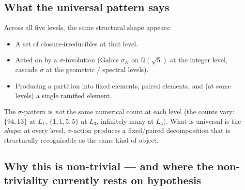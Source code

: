 \documentclass[11pt,a4paper]{article}
\theoremstyle{definition}
\theoremstyle{remark}
\begin{document}
\subsection{What the universal pattern says}

Across all five levels, the same structural shape appears:

\begin{itemize}\itemsep0pt
  \item A set of closure-irreducibles at that level.
  \item Acted on by a $\sigma$-involution (Galois $\sigma_K$ on $\mathbb{Q}(\sqrt{5})$ at the integer level, cascade $\sigma$ at the geometric / spectral levels).
  \item Producing a partition into fixed elements, paired elements, and (at some levels) a single ramified element.
\end{itemize}

The $\sigma$-pattern is \emph{not} the same numerical count at each
level (the counts vary: $\{94, 13\}$ at $L_1$, $\{1, 1, 5, 5\}$ at $L_3$,
infinitely many at $L_4$). What is universal is the \emph{shape}: at every
level, $\sigma$-action produces a fixed/paired decomposition that is
structurally recognisable as the same kind of object.

\subsection{Why this is non-trivial --- and where the non-triviality currently rests on hypothesis}\label{ssec:nontrivial}
\end{document}
